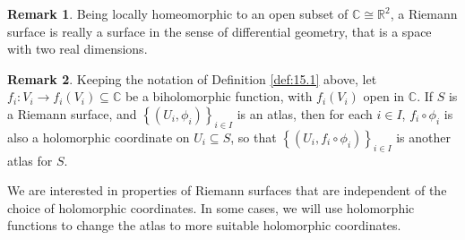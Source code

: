 \documentclass{article}
\newcommand{\R}{\mathbb{R}}
\newcommand{\C}{\mathbb{C}}
\newcommand{\rb}[1]{\left( #1 \right)}
\newcommand{\cb}[1]{\left\{ #1 \right\}}
\theoremstyle{definition}\newtheorem{definition}{Definition}[section]
\theoremstyle{definition}\newtheorem{notation}[definition]{Notation}
\theoremstyle{definition}\newtheorem{remark}[definition]{Remark}
\theoremstyle{definition}\newtheorem{example1}[definition]{Example}
\theoremstyle{definition}\newtheorem{fact}{Fact}
\theoremstyle{definition}\newtheorem{exercise}{Exercise}
\theoremstyle{definition}\newtheorem*{example2}{Example}
\begin{document}
\begin{remark}
Being locally homeomorphic to an open subset of $ \C \cong \R^2 $, a Riemann surface is really a surface in the sense of differential geometry, that is a space with two real dimensions.
\end{remark}

\begin{remark}
Keeping the notation of Definition \ref{def:15.1} above, let $ f_i : V_i \to f_i\rb{V_i} \subseteq \C $ be a biholomorphic function, with $ f_i\rb{V_i} $ open in $ \C $. If $ S $ is a Riemann surface, and $ \cb{\rb{U_i, \phi_i}}_{i \in I} $ is an atlas, then for each $ i \in I $, $ f_i \circ \phi_i $ is also a holomorphic coordinate on $ U_i \subseteq S $, so that $ \cb{\rb{U_i, f_i \circ \phi_i}}_{i \in I} $ is another atlas for $ S $.
\end{remark}

We are interested in properties of Riemann surfaces that are independent of the choice of holomorphic coordinates. In some cases, we will use holomorphic functions to change the atlas to more suitable holomorphic coordinates.
\end{document}
